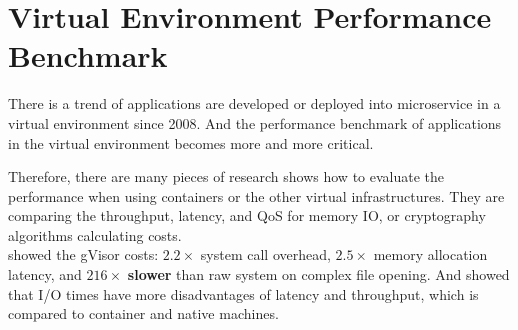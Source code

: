 \section{Virtual Environment Performance Benchmark}
There is a trend of applications are developed or deployed into microservice in a virtual
environment since 2008. And the performance benchmark of applications in the virtual
environment becomes more and more critical.

Therefore, there are many pieces of research shows how to evaluate the performance when
using containers or the other virtual infrastructures\cite{7371699,KOZHIRBAYEV2017175,7095802,234857}.
They are comparing the throughput, latency, and QoS for memory IO, or cryptography
algorithms calculating costs.\\

\textcite{234857} showed the gVisor costs: $2.2\times$ system call overhead,
$2.5\times$ memory allocation latency, and $216\times$ \textbf{slower} than raw system on
complex file opening. And \textcite{KOZHIRBAYEV2017175} showed that I/O times have more
disadvantages of latency and throughput, which is compared to container and native machines.
